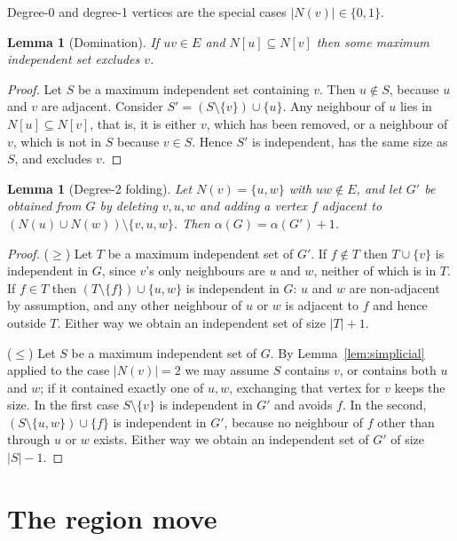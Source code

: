 \documentclass[preprint,12pt]{elsarticle}
\newtheorem{lemma}[theorem]{Lemma}
\theoremstyle{definition}
\begin{document}
Degree-0 and degree-1 vertices are the special cases $|N(v)| \in \{0,1\}$.

\begin{lemma}[Domination]
\label{lem:domination}
If $uv \in E$ and $N[u] \subseteq N[v]$ then some maximum independent set
excludes $v$.
\end{lemma}

\begin{proof}
Let $S$ be a maximum independent set containing $v$. Then $u \notin S$, because
$u$ and $v$ are adjacent. Consider $S' = (S \setminus \{v\}) \cup \{u\}$. Any
neighbour of $u$ lies in $N[u] \subseteq N[v]$, that is, it is either $v$, which
has been removed, or a neighbour of $v$, which is not in $S$ because $v \in S$.
Hence $S'$ is independent, has the same size as $S$, and excludes $v$.
\end{proof}

\begin{lemma}[Degree-2 folding]
\label{lem:fold}
Let $N(v) = \{u,w\}$ with $uw \notin E$, and let $G'$ be obtained from $G$ by
deleting $v,u,w$ and adding a vertex $f$ adjacent to
$(N(u) \cup N(w)) \setminus \{v,u,w\}$. Then $\alpha(G) = \alpha(G') + 1$.
\end{lemma}

\begin{proof}
($\ge$) Let $T$ be a maximum independent set of $G'$. If $f \notin T$ then
$T \cup \{v\}$ is independent in $G$, since $v$'s only neighbours are $u$ and
$w$, neither of which is in $T$. If $f \in T$ then $(T \setminus \{f\}) \cup
\{u,w\}$ is independent in $G$: $u$ and $w$ are non-adjacent by assumption, and
any other neighbour of $u$ or $w$ is adjacent to $f$ and hence outside $T$.
Either way we obtain an independent set of size $|T| + 1$.

($\le$) Let $S$ be a maximum independent set of $G$. By
Lemma~\ref{lem:simplicial} applied to the case $|N(v)| = 2$ we may assume $S$
contains $v$, or contains both $u$ and $w$; if it contained exactly one of
$u,w$, exchanging that vertex for $v$ keeps the size. In the first case
$S \setminus \{v\}$ is independent in $G'$ and avoids $f$. In the second,
$(S \setminus \{u,w\}) \cup \{f\}$ is independent in $G'$, because no neighbour
of $f$ other than through $u$ or $w$ exists. Either way we obtain an independent
set of $G'$ of size $|S| - 1$.
\end{proof}

\section{The region move}
\label{sec:move}
\end{document}
